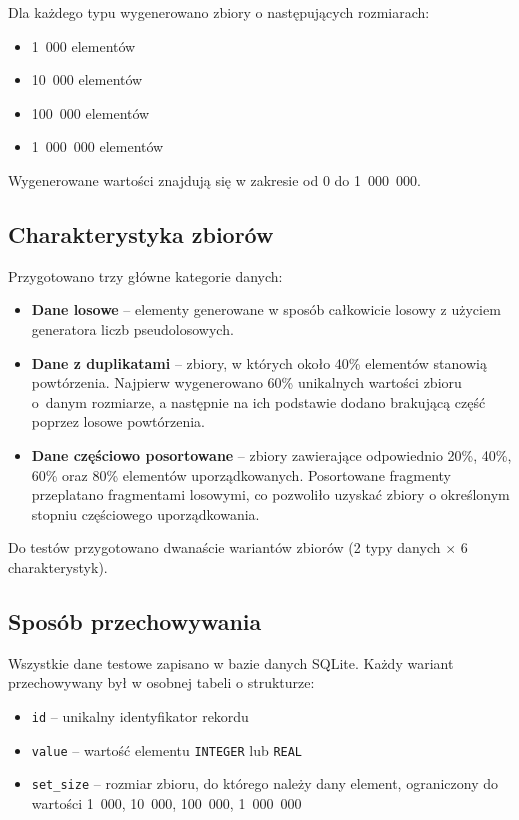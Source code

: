 Dla każdego typu wygenerowano zbiory o następujących rozmiarach:
\begin{itemize}
    \item 1~000 elementów
    \item 10~000 elementów
    \item 100~000 elementów
    \item 1~000~000 elementów
\end{itemize}

Wygenerowane wartości znajdują się w zakresie od 0 do 1~000~000.

\subsection*{Charakterystyka zbiorów}

Przygotowano trzy główne kategorie danych:

\begin{itemize}
    \item \textbf{Dane losowe} -- elementy generowane w sposób całkowicie losowy     z użyciem generatora liczb pseudolosowych.
    
    \item \textbf{Dane z duplikatami} -- zbiory, w których około 40\% elementów stanowią powtórzenia. 
    Najpierw wygenerowano 60\% unikalnych wartości zbioru o~danym rozmiarze, 
    a następnie na ich podstawie dodano brakującą część poprzez losowe powtórzenia.
    
    \item \textbf{Dane częściowo posortowane} -- zbiory zawierające odpowiednio 20\%, 40\%, 60\% oraz 80\% elementów uporządkowanych. 
    Posortowane fragmenty przeplatano fragmentami losowymi, co pozwoliło uzyskać zbiory o określonym stopniu częściowego uporządkowania.
\end{itemize}



Do testów przygotowano dwanaście wariantów zbiorów (2 typy danych $\times$ 6 charakterystyk).

\subsection*{Sposób przechowywania}

Wszystkie dane testowe zapisano w bazie danych SQLite. Każdy wariant przechowywany był w osobnej tabeli o strukturze:

\begin{itemize}
    \item \texttt{id} -- unikalny identyfikator rekordu
    \item \texttt{value} -- wartość elementu \texttt{INTEGER} lub \texttt{REAL}
    \item \texttt{set\_size} -- rozmiar zbioru, do którego należy dany element, ograniczony do wartości 1~000, 10~000, 100~000, 1~000~000
\end{itemize}